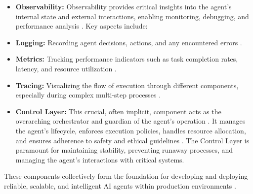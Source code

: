 \begin{itemize}
  \item \textbf{Observability:} Observability provides critical insights into the agent's internal state and external interactions, enabling monitoring, debugging, and performance analysis \cite{Reger2026}. Key aspects include:
  \item \textbf{Logging:} Recording agent decisions, actions, and any encountered errors \cite{Gartner2025}.
  \item \textbf{Metrics:} Tracking performance indicators such as task completion rates, latency, and resource utilization \cite{Reger2026}.
  \item \textbf{Tracing:} Visualizing the flow of execution through different components, especially during complex multi-step processes \cite{Gartner2025}.
\end{itemize}

\begin{itemize}
  \item \textbf{Control Layer:} This crucial, often implicit, component acts as the overarching orchestrator and guardian of the agent's operation \cite{Reger2026}. It manages the agent's lifecycle, enforces execution policies, handles resource allocation, and ensures adherence to safety and ethical guidelines \cite{Gartner2025}. The Control Layer is paramount for maintaining stability, preventing runaway processes, and managing the agent's interactions with critical systems.
\end{itemize}

These components collectively form the foundation for developing and deploying reliable, scalable, and intelligent AI agents within production environments \cite{Reger2026, Gartner2025}.
